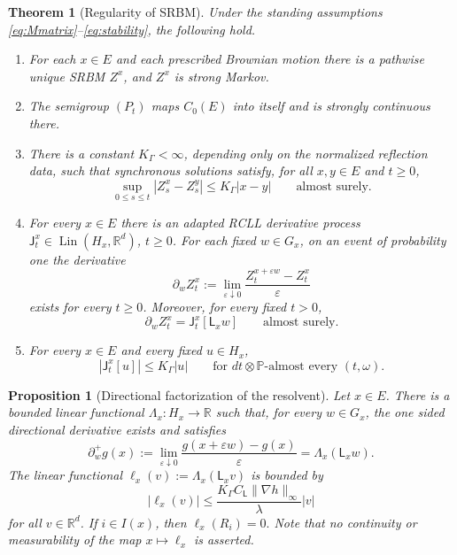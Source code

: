\documentclass[10pt,a4paper]{amsart}
\newtheorem{theorem}{Theorem}
\newtheorem{proposition}{Proposition}
\newcommand{\R}{\mathbb R}
\newcommand{\abs}[1]{\left\lvert #1\right\rvert}
\begin{document}
\begin{theorem}[Regularity of SRBM]\label{thm:regularity-SRBM}
Under the standing assumptions \eqref{eq:Mmatrix}--\eqref{eq:stability}, the
following hold.
\begin{enumerate}[label=\textup{(\roman*)}]
\item For each $x\in E$ and each prescribed Brownian motion there is a pathwise
unique SRBM $Z^x$, and $Z^x$ is strong Markov.

\item The semigroup $(P_t)$ maps $C_0(E)$ into itself and is strongly continuous
there.

\item There is a constant $K_\Gamma<\infty$, depending only on the normalized
reflection data, such that synchronous solutions satisfy, for all $x,y\in E$ and
$t\ge0$,
\begin{equation}\label{eq:pathwise-Lipschitz}
        \sup_{0\le s\le t}\abs{Z_s^x-Z_s^y}
        \le K_\Gamma\abs{x-y}
        \qquad\text{almost surely.}
\end{equation}

\item For every $x\in E$ there is an adapted RCLL derivative process
$\mathsf J_t^x\in\operatorname{Lin}(H_x,\R^d)$, $t\ge0$.  For each fixed
$w\in G_x$, on an event of probability one the derivative
\[
        \partial_w Z_t^x
        :=
        \lim_{\varepsilon\downarrow0}
        \frac{Z_t^{x+\varepsilon w}-Z_t^x}{\varepsilon}
\]
exists for every $t\ge0$.  Moreover, for every fixed $t>0$,
\begin{equation}\label{eq:fixed-time-derivative}
        \partial_w Z_t^x
        =
        \mathsf J_t^x[\mathsf L_xw]
        \qquad\text{almost surely.}
\end{equation}

\item For every $x\in E$ and every fixed $u\in H_x$,
\[
        \abs{\mathsf J_t^x[u]}
        \le
        K_\Gamma\abs{u}
        \qquad
        \text{for }dt\otimes\mathbb P\text{-almost every }(t,\omega).
\]
\end{enumerate}
\end{theorem}

\begin{proposition}[Directional factorization of the resolvent]\label{prop:resolvent-directional}
Let \(x\in E\). There is a bounded linear functional
\(\Lambda_x:H_x\to \mathbb R\) such that, for every \(w\in G_x\), the one sided
directional derivative exists and satisfies
\begin{equation}
\partial_w^+ g(x)
:=
\lim_{\varepsilon\downarrow0}
\frac{g(x+\varepsilon w)-g(x)}{\varepsilon}
=
\Lambda_x(\mathsf L_xw).
\end{equation}
The linear functional $\ell_x(v):=\Lambda_x(\mathsf L_xv)$ is bounded by
\begin{equation}
|\ell_x(v)|
\le
\frac{K_\Gamma C_{\mathsf L}\|\nabla h\|_\infty}{\lambda}|v|
\end{equation}
for all $v\in \mathbb R^d$. If \(i\in I(x)\), then $\ell_x(R_i)=0.$ Note that no continuity or measurability of the map \(x\mapsto \ell_x\) is asserted.
\end{proposition}
\end{document}
